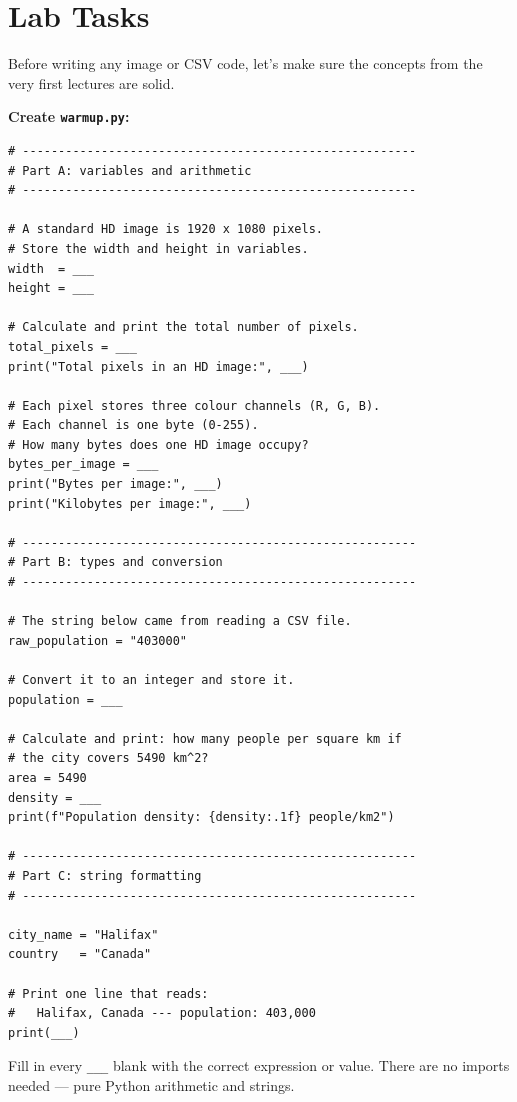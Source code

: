 \documentclass{cslab}
\begin{document}
\section{Lab Tasks}


Before writing any image or CSV code, let's make sure the concepts from the very first
lectures are solid.

\textbf{Create \texttt{warmup.py}:}

\begin{lstlisting}
# -------------------------------------------------------
# Part A: variables and arithmetic
# -------------------------------------------------------

# A standard HD image is 1920 x 1080 pixels.
# Store the width and height in variables.
width  = ___
height = ___

# Calculate and print the total number of pixels.
total_pixels = ___
print("Total pixels in an HD image:", ___)

# Each pixel stores three colour channels (R, G, B).
# Each channel is one byte (0-255).
# How many bytes does one HD image occupy?
bytes_per_image = ___
print("Bytes per image:", ___)
print("Kilobytes per image:", ___)

# -------------------------------------------------------
# Part B: types and conversion
# -------------------------------------------------------

# The string below came from reading a CSV file.
raw_population = "403000"

# Convert it to an integer and store it.
population = ___

# Calculate and print: how many people per square km if
# the city covers 5490 km^2?
area = 5490
density = ___
print(f"Population density: {density:.1f} people/km2")

# -------------------------------------------------------
# Part C: string formatting
# -------------------------------------------------------

city_name = "Halifax"
country   = "Canada"

# Print one line that reads:
#   Halifax, Canada --- population: 403,000
print(___)
\end{lstlisting}

\begin{note}
Fill in every \texttt{\_\_\_} blank with the correct expression or value.  There are no
imports needed --- pure Python arithmetic and strings.
\end{note}
\end{document}
